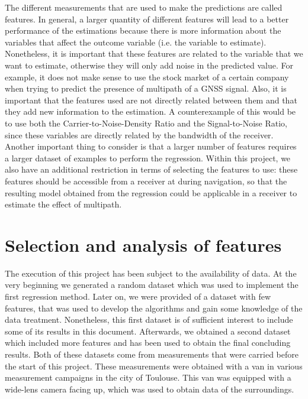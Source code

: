 \documentclass[a4paper, report, oneside, UKenglish]{memoir}
\begin{document}
The different measurements that are used to make the predictions are called features. In general, a larger quantity of different features will lead to a better performance of the estimations because there is more information about the variables that affect the outcome variable (i.e. the variable to estimate). Nonetheless, it is important that these features are related to the variable that we want to estimate, otherwise they will only add noise in the predicted value. For example, it does not make sense to use the stock market of a certain company when trying to predict the presence of multipath of a GNSS signal. Also, it is important that the features used are not directly related between them and that they add new information to the estimation. A counterexample of this would be to use both the Carrier-to-Noise-Density Ratio and the Signal-to-Noise Ratio, since these variables are directly related by the bandwidth of the receiver. Another important thing to consider is that a larger number of features requires a larger dataset of examples to perform the regression. Within this project, we also have an additional restriction in terms of selecting the features to use: these features should be accessible from a receiver at during navigation, so that the resulting model obtained from the regression could be applicable in a receiver to estimate the effect of multipath.

\section{Selection and analysis of features}
The execution of this project has been subject to the availability of data. At the very beginning we generated a random dataset which was used to implement the first regression method. Later on, we were provided of a dataset with few features, that was used to develop the algorithms and gain some knowledge of the data treatment. Nonetheless, this first dataset is of sufficient interest to include some of its results in this document. Afterwards, we obtained a second dataset which included more features and has been used to obtain the final concluding results. Both of these datasets come from measurements that were carried before the start of this project. These measurements were obtained with a van in various measurement campaigns in the city of Toulouse. This van was equipped with a wide-lens camera facing up, which was used to obtain data of the surroundings.
\end{document}
